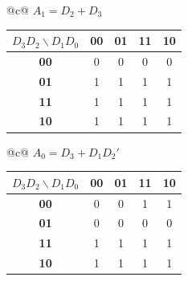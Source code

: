 \documentclass[12pt, a4paper]{article}
\begin{document}
\begin{center}
\renewcommand{\arraystretch}{1.25}
\begin{tabular}[t]{@{}c@{}}
$A_1 = D_2 + D_3$\\[3pt]
\begin{tabular}[t]{|c|c|c|c|c|}
\hline
\colorbox{gray!25}{\color{black}$D_3D_2\backslash D_1D_0$} & \colorbox{gray!25}{\color{black}\textbf{00}} & \colorbox{gray!25}{\color{black}\textbf{01}} & \colorbox{gray!25}{\color{black}\textbf{11}} & \colorbox{gray!25}{\color{black}\textbf{10}} \\ \hline
\colorbox{gray!25}{\color{black}\textbf{00}} & 0 & 0 & 0 & 0 \\ \hline
\colorbox{gray!25}{\color{black}\textbf{01}} & \colorbox{green!30}{\color{black}1} & \colorbox{green!30}{\color{black}1} & \colorbox{green!30}{\color{black}1} & \colorbox{green!30}{\color{black}1} \\ \hline
\colorbox{gray!25}{\color{black}\textbf{11}} & \colorbox{orange!55}{\color{black}1} & \colorbox{orange!55}{\color{black}1} & \colorbox{orange!55}{\color{black}1} & \colorbox{orange!55}{\color{black}1} \\ \hline
\colorbox{gray!25}{\color{black}\textbf{10}} & \colorbox{yellow!55}{\color{black}1} & \colorbox{yellow!55}{\color{black}1} & \colorbox{yellow!55}{\color{black}1} & \colorbox{yellow!55}{\color{black}1} \\ \hline
\end{tabular}
\end{tabular}
\qquad
\begin{tabular}[t]{@{}c@{}}
$A_0 = D_3 + D_1D_2'$\\[3pt]
\begin{tabular}[t]{|c|c|c|c|c|}
\hline
\colorbox{gray!25}{\color{black}$D_3D_2\backslash D_1D_0$} & \colorbox{gray!25}{\color{black}\textbf{00}} & \colorbox{gray!25}{\color{black}\textbf{01}} & \colorbox{gray!25}{\color{black}\textbf{11}} & \colorbox{gray!25}{\color{black}\textbf{10}} \\ \hline
\colorbox{gray!25}{\color{black}\textbf{00}} & 0 & 0 & \colorbox{red!25}{\color{black}1} & \colorbox{red!25}{\color{black}1} \\ \hline
\colorbox{gray!25}{\color{black}\textbf{01}} & 0 & 0 & 0 & 0 \\ \hline
\colorbox{gray!25}{\color{black}\textbf{11}} & \colorbox{blue!25}{\color{black}1} & \colorbox{blue!25}{\color{black}1} & \colorbox{blue!25}{\color{black}1} & \colorbox{blue!25}{\color{black}1} \\ \hline
\colorbox{gray!25}{\color{black}\textbf{10}} & \colorbox{blue!25}{\color{black}1} & \colorbox{blue!25}{\color{black}1} & \colorbox{orange!55}{\color{black}1} & \colorbox{orange!55}{\color{black}1} \\ \hline
\end{tabular}
\end{tabular}
\end{center}
\end{document}
